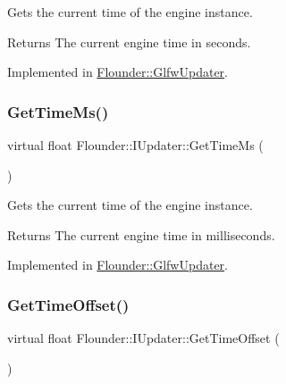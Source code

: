 Gets the current time of the engine instance. 

\begin{DoxyReturn}{Returns}
The current engine time in seconds. 
\end{DoxyReturn}


Implemented in \hyperlink{class_flounder_1_1_glfw_updater_aa137ad553810d231b78ba0767dd4c743}{Flounder\+::\+Glfw\+Updater}.

\mbox{\label{class_flounder_1_1_i_updater_a0eb42ac0880b7aedca1de356a677d197}} 
\subsubsection{\texorpdfstring{Get\+Time\+Ms()}{GetTimeMs()}}
{\footnotesize\ttfamily virtual float Flounder\+::\+I\+Updater\+::\+Get\+Time\+Ms (\begin{DoxyParamCaption}{ }\end{DoxyParamCaption})\hspace{0.3cm}{\ttfamily [pure virtual]}}



Gets the current time of the engine instance. 

\begin{DoxyReturn}{Returns}
The current engine time in milliseconds. 
\end{DoxyReturn}


Implemented in \hyperlink{class_flounder_1_1_glfw_updater_aab04afa141bf3837a25159746919e2df}{Flounder\+::\+Glfw\+Updater}.

\mbox{\label{class_flounder_1_1_i_updater_a5cf09c1bdf1169168f08a0ac1a98b85f}} 
\subsubsection{\texorpdfstring{Get\+Time\+Offset()}{GetTimeOffset()}}
{\footnotesize\ttfamily virtual float Flounder\+::\+I\+Updater\+::\+Get\+Time\+Offset (\begin{DoxyParamCaption}{ }\end{DoxyParamCaption})\hspace{0.3cm}{\ttfamily [pure virtual]}}



